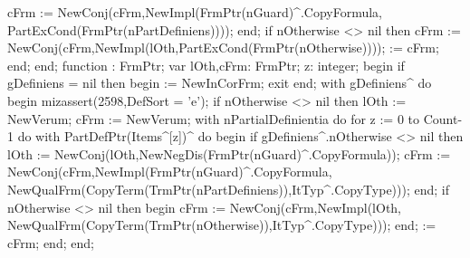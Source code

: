             cFrm := NewConj(cFrm,NewImpl(FrmPtr(nGuard)^.CopyFormula,
                                         PartExCond(FrmPtr(nPartDefiniens))));
         end;
      if nOtherwise <> nil then
         cFrm := NewConj(cFrm,NewImpl(lOth,PartExCond(FrmPtr(nOtherwise))));
       := cFrm;
   end;
end;
\eatline
{}\nwendcode{}\nwdocspar
\nwenddocs{}\endmoddef\nwstartdeflinemarkup{}\nwenddeflinemarkup
function : FrmPtr;
var
   lOth,cFrm: FrmPtr;
   z: integer;
begin
   if gDefiniens = nil then
   begin  := NewInCorFrm; exit end;
   with gDefiniens^ do
   begin
      mizassert(2598,DefSort = 'e');
      if nOtherwise <> nil then lOth := NewVerum;
      cFrm := NewVerum;
      with nPartialDefinientia do
         for z := 0 to Count-1 do
            with PartDefPtr(Items^[z])^ do
         begin
            if gDefiniens^.nOtherwise <> nil then
               lOth := NewConj(lOth,NewNegDis(FrmPtr(nGuard)^.CopyFormula));
            cFrm := NewConj(cFrm,NewImpl(FrmPtr(nGuard)^.CopyFormula,
                                         NewQualFrm(CopyTerm(TrmPtr(nPartDefiniens)),ItTyp^.CopyType)));
         end;
      if nOtherwise <> nil then
      begin
         cFrm := NewConj(cFrm,NewImpl(lOth,
                                      NewQualFrm(CopyTerm(TrmPtr(nOtherwise)),ItTyp^.CopyType)));
      end;
       := cFrm;
  end;
end;
\eatline
{}\nwendcode{}\nwdocspar
\nwenddocs{}\endmoddef\nwstartdeflinemarkup{}\nwenddeflinemarkup
